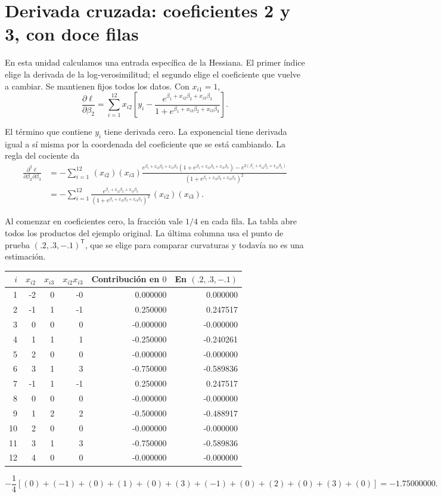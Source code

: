 \documentclass[11pt,a4paper]{article}
\begin{document}
\clearpage
\section{Derivada cruzada: coeficientes 2 y 3, con doce filas}\label{logit24}
En esta unidad calculamos una entrada específica de la Hessiana.
El primer índice elige la derivada de la log-verosimilitud; el segundo
elige el coeficiente que vuelve a cambiar.
Se mantienen fijos todos los datos. Con $x_{i1}=1$,
\[
\frac{\partial\ell}{\partial\beta_2}=\sum_{i=1}^{12}x_{i2}\left[y_i-\frac{e^{\beta_1+x_{i2}\beta_2+x_{i3}\beta_3}}{1+e^{\beta_1+x_{i2}\beta_2+x_{i3}\beta_3}}\right].
\]

El término que contiene $y_i$ tiene derivada cero.
La exponencial tiene derivada igual a sí misma por la coordenada
del coeficiente que se está cambiando. La regla del cociente da
\[
\begin{aligned}
\frac{\partial^2\ell}{\partial\beta_2\partial\beta_3}&=-\sum_{i=1}^{12}\,(x_{i2})(x_{i3})\frac{e^{\beta_1+x_{i2}\beta_2+x_{i3}\beta_3}(1+e^{\beta_1+x_{i2}\beta_2+x_{i3}\beta_3})-e^{2(\beta_1+x_{i2}\beta_2+x_{i3}\beta_3)}}{(1+e^{\beta_1+x_{i2}\beta_2+x_{i3}\beta_3})^2}\\&=-\sum_{i=1}^{12}\frac{e^{\beta_1+x_{i2}\beta_2+x_{i3}\beta_3}}{(1+e^{\beta_1+x_{i2}\beta_2+x_{i3}\beta_3})^2}\,(x_{i2})(x_{i3}).\end{aligned}
\]

Al comenzar en coeficientes cero, la fracción vale $1/4$ en cada fila.
La tabla abre todos los productos del ejemplo original. La última
columna usa el punto de prueba $(.2,.3,-.1)^\mathsf T$, que se elige
para comparar curvaturas y todavía no es una estimación.
\begin{center}\small
\begin{tabular}{rrrrrr}
\toprule
$i$&$x_{i2}$&$x_{i3}$&$x_{i2}x_{i3}$&Contribución en $0$&En $(.2,.3,-.1)$\\\midrule1&-2&0&-0&0.000000&0.000000\\
2&-1&1&-1&0.250000&0.247517\\
3&0&0&0&-0.000000&-0.000000\\
4&1&1&1&-0.250000&-0.240261\\
5&2&0&0&-0.000000&-0.000000\\
6&3&1&3&-0.750000&-0.589836\\
7&-1&1&-1&0.250000&0.247517\\
8&0&0&0&-0.000000&-0.000000\\
9&1&2&2&-0.500000&-0.488917\\
10&2&0&0&-0.000000&-0.000000\\
11&3&1&3&-0.750000&-0.589836\\
12&4&0&0&-0.000000&-0.000000\\\bottomrule\end{tabular}\end{center}\[
-\frac14\left[(0)+(-1)+(0)+(1)+(0)+(3)+(-1)+(0)+(2)+(0)+(3)+(0)\right]=-1.75000000.
\]
\end{document}
